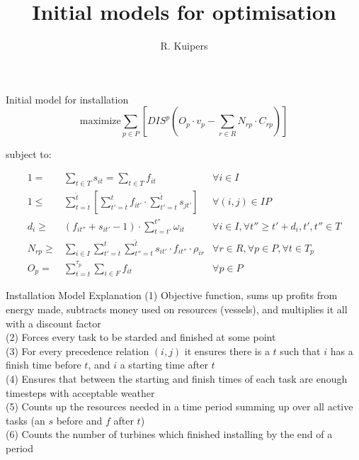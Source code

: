 \documentclass{beamer}
\title[Initial models for optimisation]{Initial models for optimisation}
\author{R. Kuipers}
\begin{document}
\begin{frame}
  \titlepage
\end{frame}

\begin{frame}{Initial model for installation}
\footnotesize
\begin{equation}
	\text{maximize} \sum_{p \in P} [ DIS^p (O_p \cdot v_p - \sum_{r \in R} N_{rp} \cdot C_{rp}) ]
\end{equation}

\bigskip
subject to:

\begin{align}
1 =& \sum_{t \in T} s_{it}	= \sum_{t \in T} f_{it}										&	\forall i \in I 						\\
1 \leq& \sum_{t = \dot{t}}^{\hat{t}} [ \sum_{t' = \dot{t}}^t f_{it'} \cdot \sum_{t' = t}^{\hat{t}} s_{jt'} ]	&	\forall (i, j) \in IP					\\
d_i \geq& (f_{it''} + s_{it'} - 1) \cdot \sum_{t = t'}^{t''} \omega_{it} 							& 	\forall i \in I, 	\forall t'' \geq t' + d_i, t', t'' \in T	\\
N_{rp} \geq& \sum_{i\in I} \sum_{t' = \dot{t}}^t \sum_{t'' = t}^{\hat{t}} s_{it'} \cdot f_{it''} \cdot \rho_{ir}	& 	\forall r \in R, \forall p \in P, \forall t \in T_p 	\\
O_p =&  \sum_{ t = \dot{t}}^{\tau_p} \sum_{i \in F} f_{it}									&	\forall p \in P
\end{align}

\end{frame}

\begin{frame}{Installation Model Explanation}
(1) Objective function, sums up profits from energy made, subtracts money used on resources (vessels), and multiplies it all with a discount factor	\\
(2) Forces every task to be starded and finished at some point	\\
(3) For every precedence relation $(i, j)$ it ensures there is a $t$ such that $i$ has a finish time before $t$, and $i$ a starting time after $t$	\\
(4) Ensures that between the starting and finish times of each task are enough timesteps with acceptable weather	\\
(5) Counts up the resources needed in a time period summing up over all active tasks (an $s$ before and $f$ after $t$)	\\
(6) Counts the number of turbines which finished installing by the end of a period	
\end{frame}
\end{document}
